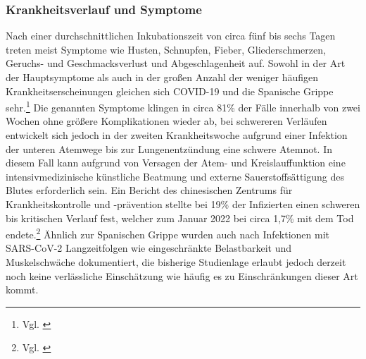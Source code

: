 \documentclass[12pt]{article}
\begin{document}
\subsubsection{Krankheitsverlauf und Symptome} \label{subsec:Cov-Verlauf}
 Nach einer durchschnittlichen Inkubationszeit von circa fünf bis sechs Tagen treten meist Symptome wie Husten, Schnupfen, Fieber, Gliederschmerzen, Geruchs- und Geschmacksverlust und Abgeschlagenheit auf. Sowohl in der Art der Hauptsymptome als auch in der großen Anzahl der weniger häufigen Krankheitserscheinungen gleichen sich COVID-19 und die Spanische Grippe sehr.\footnote{Vgl. \cite{Gov21}} Die genannten Symptome klingen in circa 81\% der Fälle innerhalb von zwei Wochen ohne größere Komplikationen wieder ab, bei schwereren Verläufen entwickelt sich jedoch in der zweiten Krankheitswoche aufgrund einer Infektion der unteren Atemwege bis zur Lungenentzündung eine schwere Atemnot. In diesem Fall kann aufgrund von Versagen der Atem- und Kreislauffunktion eine intensivmedizinische künstliche Beatmung und externe Sauerstoffsättigung des Blutes erforderlich sein. Ein Bericht des chinesischen Zentrums für Krankheitskontrolle und -prävention stellte bei 19\% der Infizierten einen schweren bis kritischen Verlauf fest, welcher zum Januar 2022 bei circa 1,7\% mit dem Tod endete.\footnote{Vgl. \cite{Cov22}} Ähnlich zur Spanischen Grippe wurden auch nach Infektionen mit SARS-CoV-2 Langzeitfolgen wie eingeschränkte Belastbarkeit und Muskelschwäche dokumentiert, die bisherige Studienlage erlaubt jedoch derzeit noch keine verlässliche Einschätzung wie häufig es zu Einschränkungen dieser Art kommt.
 
\end{document}
